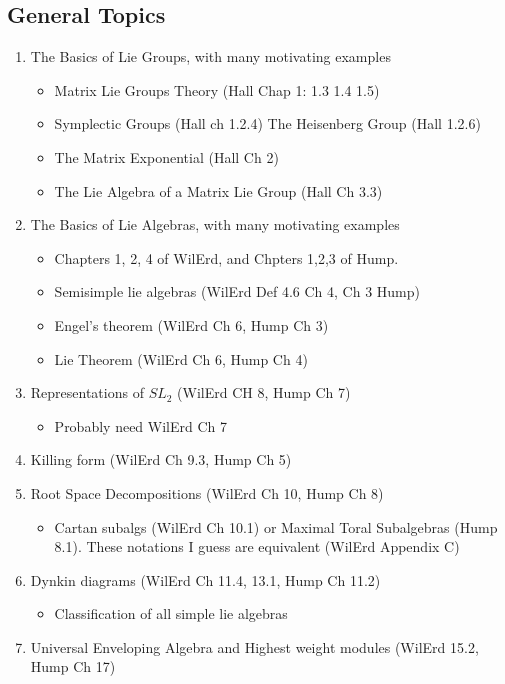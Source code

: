 \documentclass[12pt]{amsart}
\begin{document}
\subsection*{General Topics}
\begin{enumerate}
    \item The Basics of Lie Groups, with many motivating examples
    \begin{itemize}
        \item Matrix Lie Groups Theory (Hall Chap 1: 1.3 1.4 1.5)
        \item Symplectic Groups (Hall ch 1.2.4) The Heisenberg Group (Hall 1.2.6)
        \item The Matrix Exponential (Hall Ch 2)
        \item The Lie Algebra of a Matrix Lie Group (Hall Ch 3.3)
    \end{itemize}
    \item The Basics of Lie Algebras, with many motivating examples
    \begin{itemize}
        \item Chapters 1, 2, 4 of WilErd, and Chpters 1,2,3 of Hump.
        \item Semisimple lie algebras (WilErd Def 4.6 Ch 4, Ch 3 Hump)
        \item Engel's theorem (WilErd Ch 6, Hump Ch 3)
        \item Lie Theorem (WilErd Ch 6, Hump Ch 4)
    \end{itemize}
    \item Representations of $SL_2$ (WilErd CH 8, Hump Ch 7)
    \begin{itemize}
        \item Probably need WilErd Ch 7
    \end{itemize}
    \item Killing form (WilErd Ch 9.3, Hump Ch 5)
    \item Root Space Decompositions (WilErd Ch 10, Hump Ch 8)
    \begin{itemize}
        \item Cartan subalgs (WilErd Ch 10.1) or Maximal Toral 
        Subalgebras (Hump 8.1). These notations I guess are 
        equivalent (WilErd Appendix C)
    \end{itemize}
    \item Dynkin diagrams  (WilErd Ch 11.4, 13.1, Hump Ch 11.2)
    \begin{itemize}
        \item Classification of all simple lie algebras
    \end{itemize}
    \item Universal Enveloping Algebra and Highest weight modules (WilErd 15.2, Hump Ch 17)
\end{enumerate}
\end{document}
